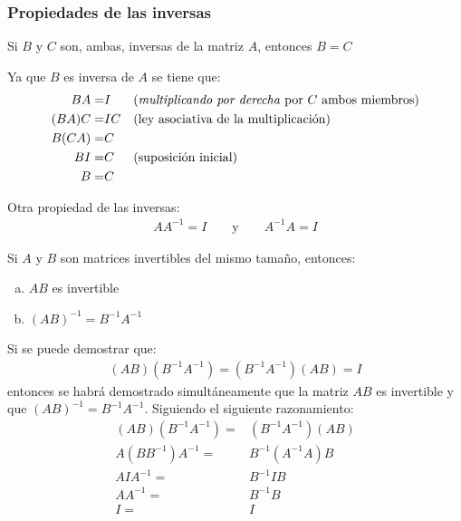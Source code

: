 \documentclass[a4paper,12pt]{article}
\begin{document}
\subsubsection{Propiedades de las inversas}

\begin{theorem}
  Si $B$ y $C$ son, ambas, inversas de la matriz $A$, entonces $B=C$
  \label{theo:propinv}
\end{theorem}

\demo Ya que $B$ es inversa de $A$ se tiene que:
\begin{align*}
     BA=&I && \mbox{(\emph{multiplicando por derecha} por $C$ ambos miembros)}\\
  (BA)C=&IC&& \mbox{(ley asociativa de la multiplicación)}\\
  B(CA)=&C && \\
     BI=&C && \mbox{(suposición inicial)} \\
      B=&C  
\end{align*}

Otra propiedad de las inversas:
\begin{align*}
  AA^{-1}=I \qquad \mbox{y} \qquad A^{-1}A=I
\end{align*}

\begin{theorem}
  Si $A$ y $B$ son matrices invertibles del mismo tamaño, entonces:
  \begin{enumerate}[(a)]
    \item $AB$ es invertible
    \item $(AB)^{-1}=B^{-1}A^{-1}$
  \end{enumerate}
  \label{theo:compinv}
\end{theorem}

\demo Si se puede demostrar que:
\begin{align*}
  (AB)(B^{-1}A^{-1})=(B^{-1}A^{-1})(AB)=I
\end{align*}
entonces se habrá demostrado simultáneamente que la matriz $AB$ es invertible
y que $(AB)^{-1}=B^{-1}A^{-1}$.
Siguiendo el siguiente razonamiento:
\begin{align*}
  (AB)(B^{-1}A^{-1})=&(B^{-1}A^{-1})(AB) \\
  A(BB^{-1})A^{-1}=&B^{-1}(A^{-1}A)B \\
  AIA^{-1}=&B^{-1}IB \\
  AA^{-1}=&B^{-1}B \\
  I=&I
\end{align*}
\end{document}
